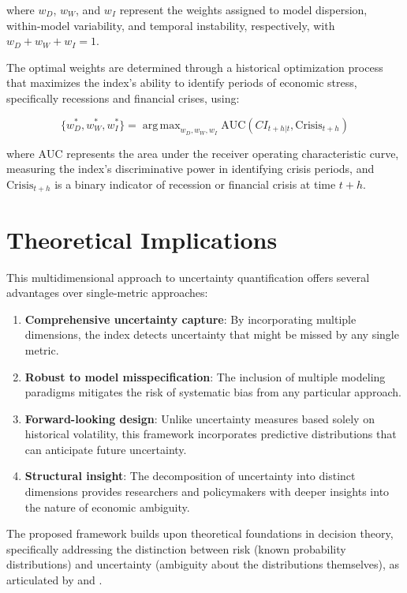 \documentclass[5p,authoryear]{elsarticle}
\DeclareMathOperator*{\argmax}{arg\,max}
\begin{document}
where $w_D$, $w_W$, and $w_I$ represent the weights assigned to model dispersion, within-model variability, and temporal instability, respectively, with $w_D + w_W + w_I = 1$.

The optimal weights are determined through a historical optimization process that maximizes the index's ability to identify periods of economic stress, specifically recessions and financial crises, using:

\begin{equation}
\{w_D^*, w_W^*, w_I^*\} = \argmax_{w_D, w_W, w_I} \text{AUC}(CI_{t+h|t}, \text{Crisis}_{t+h})
\end{equation}

where $\text{AUC}$ represents the area under the receiver operating characteristic curve, measuring the index's discriminative power in identifying crisis periods, and $\text{Crisis}_{t+h}$ is a binary indicator of recession or financial crisis at time $t+h$.

\section{Theoretical Implications}

This multidimensional approach to uncertainty quantification offers several advantages over single-metric approaches:

\begin{enumerate}
    \item \textbf{Comprehensive uncertainty capture}: By incorporating multiple dimensions, the index detects uncertainty that might be missed by any single metric.
    
    \item \textbf{Robust to model misspecification}: The inclusion of multiple modeling paradigms mitigates the risk of systematic bias from any particular approach.
    
    \item \textbf{Forward-looking design}: Unlike uncertainty measures based solely on historical volatility, this framework incorporates predictive distributions that can anticipate future uncertainty.
    
    \item \textbf{Structural insight}: The decomposition of uncertainty into distinct dimensions provides researchers and policymakers with deeper insights into the nature of economic ambiguity.
\end{enumerate}

The proposed framework builds upon theoretical foundations in decision theory, specifically addressing the distinction between risk (known probability distributions) and uncertainty (ambiguity about the distributions themselves), as articulated by \citet{Knight1921} and \citet{Ellsberg1961}.
\end{document}
